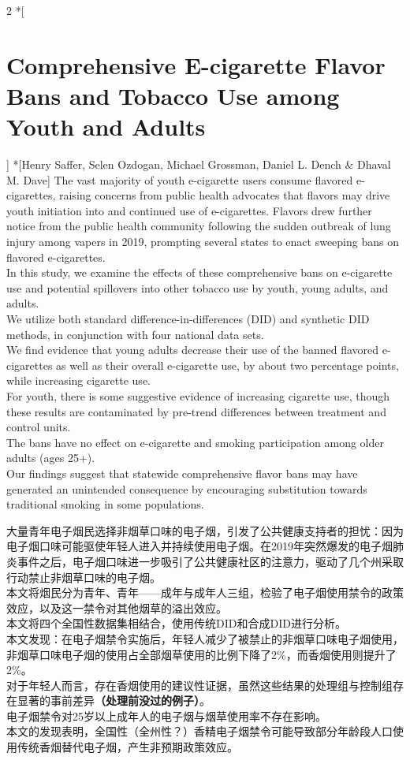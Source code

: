 \documentclass[cn,hazy,blue,14pt,screen]{elegantnote}
\begin{document}
\begin{paracol}{2}
	\switchcolumn[0]*[\section{Comprehensive E-cigarette Flavor Bans and Tobacco Use among Youth and Adults}] 
	\switchcolumn[0]*[Henry Saffer, Selen Ozdogan, Michael Grossman, Daniel L. Dench \& Dhaval M. Dave]
	The vast majority of youth e-cigarette users consume flavored e-cigarettes, raising concerns from public health advocates that flavors may drive youth initiation into and continued use of e-cigarettes. Flavors drew further notice from the public health community following the sudden outbreak of lung injury among vapers in 2019, prompting several states to enact sweeping bans on flavored e-cigarettes.\\
	In this study, we examine the effects of these comprehensive bans on e-cigarette use and potential spillovers into other tobacco use by youth, young adults, and adults.\\
	We utilize both standard difference-in-differences (DID) and synthetic DID methods, in conjunction with four national data sets.\\
	We find evidence that young adults decrease their use of the banned flavored e-cigarettes as well as their overall e-cigarette use, by about two percentage points, while increasing cigarette use. \\
	For youth, there is some suggestive evidence of increasing cigarette use, though these results are contaminated by pre-trend differences between treatment and control units. \\
	The bans have no effect on e-cigarette and smoking participation among older adults (ages 25+). \\
	Our findings suggest that statewide comprehensive flavor bans may have generated an unintended consequence by encouraging substitution towards traditional smoking in some populations.
	
	\switchcolumn
	大量青年电子烟民选择非烟草口味的电子烟，引发了公共健康支持者的担忧：因为电子烟口味可能驱使年轻人进入并持续使用电子烟。在2019年突然爆发的电子烟肺炎事件之后，电子烟口味进一步吸引了公共健康社区的注意力，驱动了几个州采取行动禁止非烟草口味的电子烟。\\
	本文将烟民分为青年、青年——成年与成年人三组，检验了电子烟使用禁令的政策效应，以及这一禁令对其他烟草的溢出效应。\\
	本文将四个全国性数据集相结合，使用传统DID和合成DID进行分析。\\
	本文发现：在电子烟禁令实施后，年轻人减少了被禁止的非烟草口味电子烟使用，非烟草口味电子烟的使用占全部烟草使用的比例下降了2\%，而香烟使用则提升了2\%。\\
	对于年轻人而言，存在香烟使用的建议性证据，虽然这些结果的处理组与控制组存在显著的事前差异\textbf{（处理前没过的例子）}。\\
	电子烟禁令对25岁以上成年人的电子烟与烟草使用率不存在影响。\\
	本文的发现表明，全国性（全州性？）香精电子烟禁令可能导致部分年龄段人口使用传统香烟替代电子烟，产生非预期政策效应。
\end{paracol}
\end{document}

